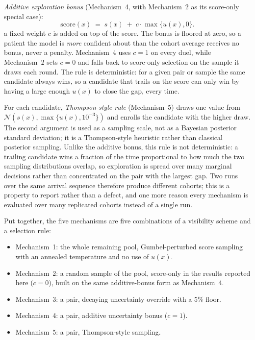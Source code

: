 \vspace{10pt}

\emph{Additive exploration bonus} (Mechanism~4, with Mechanism~2 as its score-only
special case):
\[
  \text{score}(x) \;=\; s(x) \;+\; c \cdot \max\{u(x),0\}.
\]
a fixed weight $c$ is added on top of the score. The bonus is floored at zero, so a patient
the model is \emph{more} confident about than the cohort average receives no bonus, never
a penalty. Mechanism~4 uses $c=1$ on every duel, while Mechanism~2 sets $c=0$ and falls
back to score-only selection on the sample it draws each round. The rule is deterministic:
for a given pair or sample the same candidate always wins, so a candidate that trails on
the score can only win by having a large enough $u(x)$ to close the gap, every time.

\vspace{10pt}

For each candidate, \emph{Thompson-style rule} \citep{thompson1933} (Mechanism~5) draws one value from
$\mathcal{N}(s(x),\max\{u(x),10^{-3}\})$ and enrolls the candidate with the higher draw.
The second argument is used as a sampling scale, not as a Bayesian posterior standard
deviation; it is a Thompson-style heuristic rather than classical posterior
sampling. Unlike the additive bonus, this rule is not deterministic: a trailing candidate
wins a fraction of the time proportional to how much the two sampling distributions
overlap, so exploration is spread over many marginal decisions rather than concentrated on
the pair with the largest gap. Two runs over the same arrival sequence therefore produce
different cohorts; this is a property to report rather than a defect, and one more reason
every mechanism is evaluated over many replicated cohorts instead of a single run.

\vspace{10pt}

Put together, the five mechanisms are five combinations of a visibility scheme and a
selection rule:
\begin{itemize}
  \item Mechanism~1: the whole remaining pool, Gumbel-perturbed score sampling with
  an annealed temperature and no use of $u(x)$.
  \item Mechanism~2: a random sample of the pool, score-only in the results reported
  here ($c=0$), built on the same additive-bonus form as Mechanism~4.
  \item Mechanism~3: a pair, decaying uncertainty override with a 5\% floor.
  \item Mechanism~4: a pair, additive uncertainty bonus ($c=1$).
  \item Mechanism~5: a pair, Thompson-style sampling.
\end{itemize}

